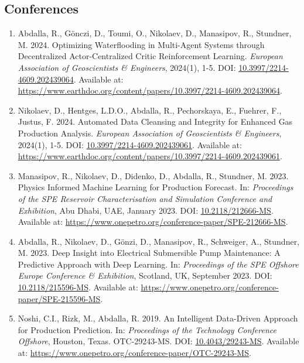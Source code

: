 \documentclass[a4paper,10pt]{article}
\begin{document}
\subsection*{Conferences}
\begin{enumerate}[leftmargin=0.5cm]

    \item Abdalla, R., Gönczi, D., Toumi, O., Nikolaev, D., Manasipov, R., Stundner, M. 2024. Optimizing Waterflooding in Multi-Agent Systems through Decentralized Actor-Centralized Critic Reinforcement Learning. \textit{European Association of Geoscientists \& Engineers}, 2024(1), 1-5. DOI: \href{https://doi.org/10.3997/2214-4609.202439064}{10.3997/2214-4609.202439064}. Available at: \url{https://www.earthdoc.org/content/papers/10.3997/2214-4609.202439064}.

    \item Nikolaev, D., Hentges, L.D.O., Abdalla, R., Pechorskaya, E., Fuehrer, F., Justus, F. 2024. Automated Data Cleansing and Integrity for Enhanced Gas Production Analysis. \textit{European Association of Geoscientists \& Engineers}, 2024(1), 1-5. DOI: \href{https://doi.org/10.3997/2214-4609.202439061}{10.3997/2214-4609.202439061}. Available at: \url{https://www.earthdoc.org/content/papers/10.3997/2214-4609.202439061}.

    \item Manasipov, R., Nikolaev, D., Didenko, D., Abdalla, R., Stundner, M. 2023. Physics Informed Machine Learning for Production Forecast. In: \textit{Proceedings of the SPE Reservoir Characterisation and Simulation Conference and Exhibition}, Abu Dhabi, UAE, January 2023. DOI: \href{https://doi.org/10.2118/212666-MS}{10.2118/212666-MS}. Available at: \url{https://www.onepetro.org/conference-paper/SPE-212666-MS}.

    \item Abdalla, R., Nikolaev, D., Gönzi, D., Manasipov, R., Schweiger, A., Stundner, M. 2023. Deep Insight into Electrical Submersible Pump Maintenance: A Predictive Approach with Deep Learning. In: \textit{Proceedings of the SPE Offshore Europe Conference \& Exhibition}, Scotland, UK, September 2023. DOI: \href{https://doi.org/10.2118/215596-MS}{10.2118/215596-MS}. Available at: \url{https://www.onepetro.org/conference-paper/SPE-215596-MS}.

    \item Noshi, C.I., Rizk, M., Abdalla, R. 2019. An Intelligent Data-Driven Approach for Production Prediction. In: \textit{Proceedings of the Technology Conference Offshore}, Houston, Texas. OTC-29243-MS. DOI: \href{https://doi.org/10.4043/29243-MS}{10.4043/29243-MS}. Available at: \url{https://www.onepetro.org/conference-paper/OTC-29243-MS}.


\end{enumerate}
\end{document}
